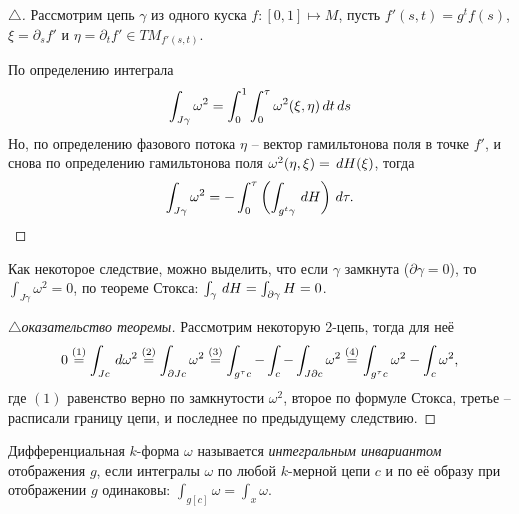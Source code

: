 \begin{proof}[$\triangle$]
Рассмотрим цепь $\gamma$ из одного куска $f \colon  [0, 1] \mapsto M$, пусть $f'(s, t) = g^t f(s)$, $\xi = \partial_s f'$ и $\eta = \partial_t f' \in TM_{f'(s, t)}$.

По определению интеграла
\begin{equation*}
    \int_{J\gamma} \omega^2 = \int_0^1 \int_0^\tau \omega^2 (\xi, \eta) \, d t \, d s
\end{equation*}
Но, по определению фазового потока $\eta$ -- вектор гамильтонова поля в точке $f'$, и снова по определению гамильтонова поля $\omega^2 (\eta, \xi) = \, d H(\xi)$, тогда
\begin{equation*}
    \int_{J\gamma} \omega^2 = - \int_0^\tau \left(
        \int_{g^t \gamma}  \, d H
    \right) \, d \tau.
\end{equation*}
\end{proof}

Как некоторое следствие, можно выделить, что если $\gamma$ замкнута ($\partial \gamma =0$), то $\int_{J\gamma} \omega^2 = 0$, по теореме Стокса: $\int_\gamma \, d H = \int_{\partial \gamma} H = 0$. 

\begin{proof}[$\triangle$оказательство теоремы]
    Рассмотрим некоторую 2-цепь, тогда для неё
    \begin{equation*}
        0 
        \overset{(1)}{=} 
        \int_{Jc} \, d \omega^2 
        \overset{(2)}{=}
        \int_{\partial Jc} \omega^2 
        \overset{(3)}{=} 
        \int_{g^\tau c} - \int_c - \int_{J \partial c} \omega^2 
        \overset{(4)}{=} 
        \int_{g^\tau c}^{} \omega^2 - \int_c \omega^2,
    \end{equation*}
    где $(1)$ равенство верно по замкнутости $\omega^2$, второе по формуле Стокса, третье -- расписали границу цепи, и последнее по предыдущему следствию. 
\end{proof}




\begin{to_def}
    Дифференциальная $k$-форма $\omega$ называется \textit{интегральным инвариантом} отображения $g$, если интегралы $\omega$ по любой $k$-мерной цепи $c$ и по её образу при отображении $g$ одинаковы: $\int_{g[c]} \omega = \int_x \omega$. 
\end{to_def}




